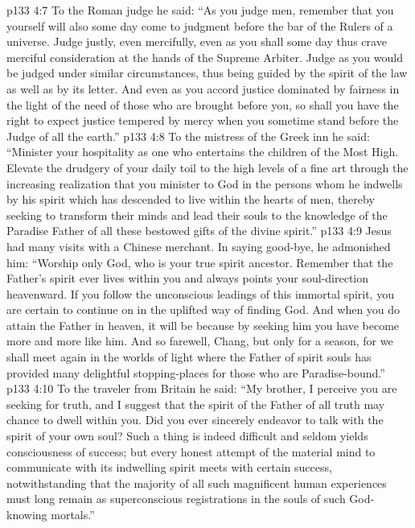 \vs p133 4:7 \pc To the Roman judge he said: \textcolor{ubdarkred}{“As you judge men, remember that you yourself will also some day come to judgment before the bar of the Rulers of a universe. Judge justly, even mercifully, even as you shall some day thus crave merciful consideration at the hands of the Supreme Arbiter. Judge as you would be judged under similar circumstances, thus being guided by the spirit of the law as well as by its letter. And even as you accord justice dominated by fairness in the light of the need of those who are brought before you, so shall you have the right to expect justice tempered by mercy when you sometime stand before the Judge of all the earth.”}
\vs p133 4:8 \pc To the mistress of the Greek inn he said: \textcolor{ubdarkred}{“Minister your hospitality as one who entertains the children of the Most High. Elevate the drudgery of your daily toil to the high levels of a fine art through the increasing realization that you minister to God in the persons whom he indwells by his spirit which has descended to live within the hearts of men, thereby seeking to transform their minds and lead their souls to the knowledge of the Paradise Father of all these bestowed gifts of the divine spirit.”}
\vs p133 4:9 \pc Jesus had many visits with a Chinese merchant. In saying good\hyp{}bye, he admonished him: \textcolor{ubdarkred}{“Worship only God, who is your true spirit ancestor. Remember that the Father’s spirit ever lives within you and always points your soul\hyp{}direction heavenward. If you follow the unconscious leadings of this immortal spirit, you are certain to continue on in the uplifted way of finding God. And when you do attain the Father in heaven, it will be because by seeking him you have become more and more like him. And so farewell, Chang, but only for a season, for we shall meet again in the worlds of light where the Father of spirit souls has provided many delightful stopping\hyp{}places for those who are Paradise\hyp{}bound.”}
\vs p133 4:10 \pc To the traveler from Britain he said: \textcolor{ubdarkred}{“My brother, I perceive you are seeking for truth, and I suggest that the spirit of the Father of all truth may chance to dwell within you. Did you ever sincerely endeavor to talk with the spirit of your own soul? Such a thing is indeed difficult and seldom yields consciousness of success; but every honest attempt of the material mind to communicate with its indwelling spirit meets with certain success, notwithstanding that the majority of all such magnificent human experiences must long remain as superconscious registrations in the souls of such God\hyp{}knowing mortals.”}
